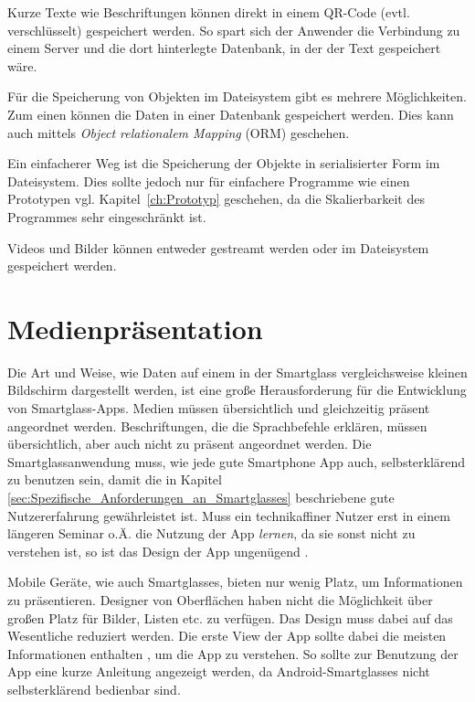 Kurze Texte wie Beschriftungen können direkt in einem QR-Code (evtl. verschlüsselt) gespeichert werden. So spart sich der Anwender die Verbindung zu einem Server und die dort hinterlegte Datenbank, in der der Text gespeichert wäre.

Für die Speicherung von Objekten im Dateisystem gibt es mehrere Möglichkeiten. Zum einen können die Daten in einer Datenbank gespeichert werden. Dies kann auch mittels \emph{Object relationalem Mapping} (ORM) geschehen.

Ein einfacherer Weg ist die Speicherung der Objekte in serialisierter Form im Dateisystem. Dies sollte jedoch nur für einfachere Programme wie einen Prototypen vgl. Kapitel~\ref{ch:Prototyp} geschehen, da die Skalierbarkeit des Programmes sehr eingeschränkt ist.

Videos und Bilder können entweder gestreamt werden oder im Dateisystem gespeichert werden.
%
%
%
%
%
%
\section{Medienpräsentation}
\label{sec:Medienpraesentation}
Die Art und Weise, wie Daten auf einem in der Smartglass vergleichsweise kleinen Bildschirm dargestellt werden, ist eine große Herausforderung für die Entwicklung von Smartglass-Apps. Medien müssen übersichtlich und gleichzeitig präsent angeordnet werden. Beschriftungen, die die Sprachbefehle erklären, müssen übersichtlich, aber auch nicht zu präsent angeordnet werden. Die Smartglassanwendung muss, wie jede gute Smartphone App auch, selbsterklärend zu benutzen sein, damit die in Kapitel \ref{sec:Spezifische_Anforderungen_an_Smartglasses} beschriebene gute Nutzererfahrung gewährleistet ist. 
Muss ein technikaffiner Nutzer erst in einem längeren Seminar o.Ä. die Nutzung der App \emph{lernen}, da sie sonst nicht zu verstehen ist, so ist das Design der App ungenügend \cite{Hoober2011} \cite[S.~141ff]{Norman2013}.

Mobile Geräte, wie auch Smartglasses, bieten nur wenig Platz, um Informationen zu präsentieren. Designer von Oberflächen haben nicht die Möglichkeit über großen Platz für Bilder, Listen etc. zu verfügen. Das Design muss dabei auf das Wesentliche reduziert werden. Die erste View der App sollte dabei die meisten Informationen enthalten \cite[S.~442]{Tidwell2005}, um die App zu verstehen. So sollte zur Benutzung der App eine kurze Anleitung angezeigt werden, da Android-Smartglasses nicht selbsterklärend bedienbar sind.

